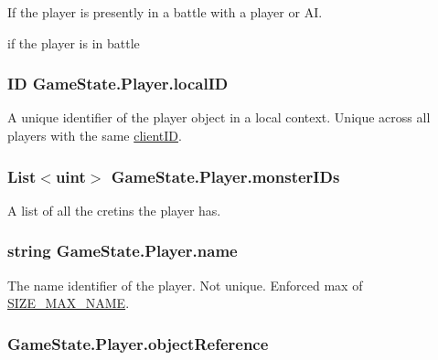 If the player is presently in a battle with a player or A\-I. 

if the player is in battle\hypertarget{class_game_state_1_1_player_ae0383475b3348fb85ba5be64433443ff}{
\subsubsection[{local\-I\-D}]{\setlength{\rightskip}{0pt plus 5cm}I\-D Game\-State.\-Player.\-local\-I\-D}}\label{class_game_state_1_1_player_ae0383475b3348fb85ba5be64433443ff}


A unique identifier of the player object in a local context. Unique across all players with the same \hyperlink{class_game_state_1_1_player_aacc123df8ea5256f83c1060a5fdd19c2}{client\-I\-D}. 

\hypertarget{class_game_state_1_1_player_a2c4ed3c60a2969cd4f891e12c8265377}{
\subsubsection[{monster\-I\-Ds}]{\setlength{\rightskip}{0pt plus 5cm}List$<$uint$>$ Game\-State.\-Player.\-monster\-I\-Ds}}\label{class_game_state_1_1_player_a2c4ed3c60a2969cd4f891e12c8265377}


A list of all the cretins the player has. 

\hypertarget{class_game_state_1_1_player_afc2b145df544ca5bffc7c87ef294bcde}{
\subsubsection[{name}]{\setlength{\rightskip}{0pt plus 5cm}string Game\-State.\-Player.\-name}}\label{class_game_state_1_1_player_afc2b145df544ca5bffc7c87ef294bcde}


The name identifier of the player. Not unique. Enforced max of \hyperlink{class_game_state_1_1_player_a1cdc9de8183b220e87632f7f6a7147d0}{S\-I\-Z\-E\-\_\-\-M\-A\-X\-\_\-\-N\-A\-M\-E}. 

\hypertarget{class_game_state_1_1_player_aebf24de01e14055dc940d0493753484f}{
\subsubsection[{object\-Reference}]{ Game\-State.\-Player.\-object\-Reference}}\label{class_game_state_1_1_player_aebf24de01e14055dc940d0493753484f}


